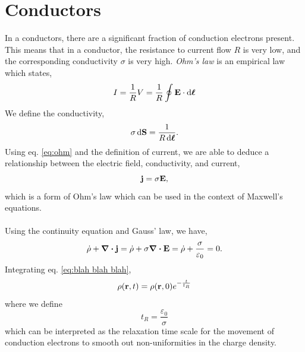 \documentclass{book}
\begin{document}
\section{Conductors}
In a conductors, there are a significant fraction of conduction electrons present. This means that in a conductor, the resistance to current flow $R$ is very low, and the corresponding conductivity $\sigma$ is very high. \textit{Ohm's law} is an empirical law which states,
\begin{equation}
	I = \frac{1}{R}V = \frac{1}{R}\oint\vb{E}\cdot\dd{\vb*{\ell}} \label{eq:ohm}
\end{equation}
We define the conductivity,
\begin{equation}
	\sigma \dd{\vb{S}} = \frac{1}{R\dd{\vb*{\ell}}}.
\end{equation}
Using eq. \eqref{eq:ohm} and the definition of current, we are able to deduce a relationship between the electric field, conductivity, and current,
\begin{equation}
	\vb{j} = \sigma \vb{E},
\end{equation}
which is a form of Ohm's law which can be used in the context of Maxwell's equations.
\\\\
Using the continuity equation and Gauss' law, we have,
\begin{equation}
	\Dot{\rho} + \div{\vb{j}} = \Dot{\rho} + \sigma\div{\vb{E}} = \Dot{\rho} + \frac{\sigma}{\varepsilon_0} = 0. \label{eq:blah blah blah}
\end{equation}
Integrating eq. \eqref{eq:blah blah blah}, 
\begin{equation}
	\rho(\vb{r},t) = \rho(\vb{r}, 0)e^{-\frac{t}{t_R}}
\end{equation}
where we define
\begin{equation}
	t_R = \frac{\varepsilon_0}{\sigma}
\end{equation}
which can be interpreted as the relaxation time scale for the movement of conduction electrons to smooth out non-uniformities in the charge density.
\end{document}
